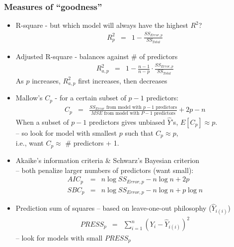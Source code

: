 \documentclass[12pt]{notes}
\begin{document}
\subsubsection{Measures of ``goodness''}
\begin{itemize}
     \item R-square - but which model will always have the highest $R^2$?
        \begin{eqnarray}
           R^2_p & = & 1 - \frac{SS_{Error,p}}{SS_{Total}} \nonumber
        \end{eqnarray}
     \item Adjusted R-square - balances against \# of predictors
        \begin{eqnarray}
           R^2_{a,p} & = & 1 - \frac{n-1}{n-p}\cdot\frac{SS_{Error,p}}{SS_{Total}} \nonumber
        \end{eqnarray}
       As $p$ increases, $R^2_{a,p}$ first increases, then decreases
     \item Mallow's $C_p$ - for a certain subset of $p-1$ predictors:
        \begin{eqnarray}
           C_p & = & \frac{\mbox{$SS_{Error}$ from model with $p-1$ predictors}}{\mbox{$MSE$ from model with $P-1$ predictors}} + 2p - n \nonumber
        \end{eqnarray}
        When a subset of $p-1$ predictors gives unbiased $\hat{Y}$'s, $E[C_p] \approx p$.\\
     -- so look for model with smallest $p$ such that $C_p \approx p$,\\ i.e., want $C_p \approx$ \# predictors + 1.
    \item Akaike's information criteria \& Schwarz's Bayesian criterion\\
    -- both penalize larger numbers of predictors (want small):
        \begin{eqnarray}
           AIC_p & = & n \log SS_{Error,p} - n \log n + 2 p \nonumber \\
           SBC_p & = & n \log SS_{Error,p} - n \log n + p \log n \nonumber
        \end{eqnarray}
    \item Prediction sum of squares -- based on leave-one-out philosophy ($\hat{Y}_{i(i)}$)
       \begin{eqnarray}
          PRESS_p & = & \sum_{i=1}^n \left(Y_i - \hat{Y}_{i(i)} \right)^2 \nonumber
       \end{eqnarray}
    -- look for models with small $PRESS_p$
    \end{itemize}
\end{document}
